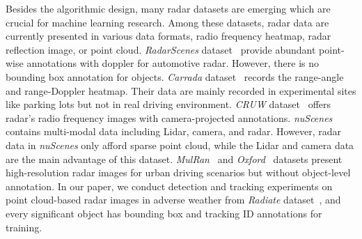 \documentclass[10pt,twocolumn,letterpaper]{article}
\begin{document}
Besides the algorithmic design, many radar datasets are emerging which are crucial for machine learning research. Among these datasets, radar data are currently presented in various data formats, \ie radio frequency heatmap, radar reflection image, or point cloud. \textit{RadarScenes} dataset~\cite{schumann2021radarscenes} provide abundant point-wise annotations with doppler for automotive radar. However, there is no bounding box annotation for objects. \textit{Carrada} dataset~\cite{ouaknine2021carrada} records the range-angle and range-Doppler heatmap. Their data are mainly recorded in experimental sites like parking lots but not in real driving environment. \textit{CRUW} dataset~\cite{wang2021rethinking} offers radar's radio frequency images with camera-projected annotations. \textit{nuScenes}~\cite{caesar2020nuscenes} contains multi-modal data including Lidar, camera, and radar. However, radar data in \textit{nuScenes} only afford sparse point cloud, while the Lidar and camera data are the main advantage of this dataset. \textit{MulRan}~\cite{kim2020mulran} and \textit{Oxford}~\cite{barnes2020oxford} datasets present high-resolution radar images for urban driving scenarios but without object-level annotation. In our paper, we conduct detection and tracking experiments on point cloud-based radar images in adverse weather from \textit{Radiate} dataset~\cite{sheeny2020radiate}, and every significant object has bounding box and tracking ID annotations for training.
\end{document}
